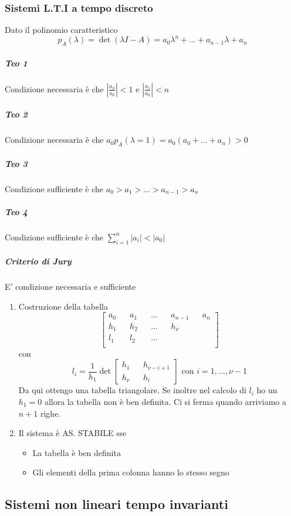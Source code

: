 \documentclass{article}
\begin{document}
	\subsubsection{Sistemi L.T.I a tempo discreto}
	Dato il polinomio caratteristico
	\begin{equation}
		p_A(\lambda) = \det(\lambda I - A) = a_0\lambda^n+...+a_{n-1}\lambda+a_n
	\end{equation}
	\subparagraph{Teo 1} Condizione necessaria è che $\left|\frac{a_n}{a_0}\right| < 1$ e $\left|\frac{a_1}{a_0}\right| < n$
	\subparagraph{Teo 2} Condizione necessaria è che $a_0p_A(\lambda = 1) = a_0(a_0+...+a_n) > 0$
	\subparagraph{Teo 3} Condizione sufficiente è che $a_0>a_1>...>a_{n-1}>a_n$
	\subparagraph{Teo 4} Condizione sufficiente è che $\sum_{i=1}^n \left|a_i\right| < \left|a_0\right|$
	
	\subparagraph{Criterio di Jury}
	E' condizione necessaria e sufficiente
	\begin{enumerate}
		\item Costruzione della tabella
			\begin{equation}
				\begin{bmatrix}
					a_0 && a_1 && ... && a_{n-1} && a_n \\
					h_1 && h_2 && ... && h_\nu \\
					l_1 && l_2 && ... \\
				\end{bmatrix}
			\end{equation}
			con
			\begin{equation}
				l_i = \frac{1}{h_1}\det
				\begin{bmatrix}
					h_1 && h_{\nu-i+1} \\
					h_\nu && h_i
				\end{bmatrix}
				\mbox{ con } i=1,...,\nu-1
			\end{equation}
			Da qui ottengo una tabella triangolare. Se inoltre nel calcolo di $l_i$ ho un $h_1 = 0$ allora la tabella non è ben definita. Ci si ferma quando arriviamo a $n+1$ righe.
		\item Il sistema è AS. STABILE  sse
			\begin{itemize}
				\item La tabella è ben definita
				\item Gli elementi della prima colonna hanno lo stesso segno
			\end{itemize}
	\end{enumerate}
	\newpage
	\subsection{Sistemi non lineari tempo invarianti}
\end{document}
